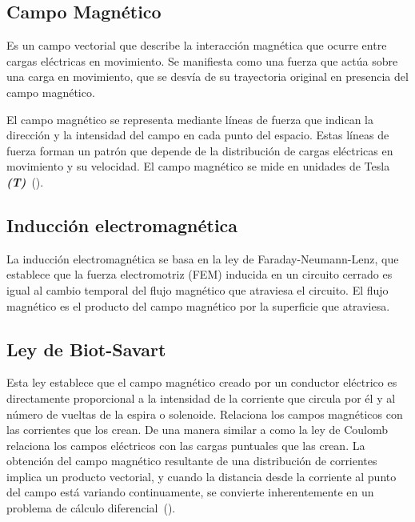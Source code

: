\documentclass[twocolumn, 12pt]{article}
\begin{document}
\subsection*{Campo Magnético}

Es un campo vectorial que describe la interacción magnética
que ocurre entre cargas eléctricas en movimiento. Se
manifiesta como una fuerza que actúa sobre una carga en
movimiento, que se desvía de su trayectoria original en
presencia del campo magnético.

El campo magnético se representa mediante líneas de fuerza
que indican la dirección y la intensidad del campo en cada
punto del espacio. Estas líneas de fuerza forman un patrón
que depende de la distribución de cargas eléctricas en
movimiento y su velocidad. El campo magnético se mide en
unidades de Tesla
\textit{\textbf{(T)}}~(\cite{magnetic-fields-khanacademy}).

\subsection*{Inducción electromagnética}

La inducción electromagnética se basa en la ley de
Faraday-Neumann-Lenz, que establece que la fuerza
electromotriz (FEM) inducida en un circuito cerrado es
igual al cambio temporal del flujo magnético que atraviesa
el circuito. El flujo magnético es el producto del campo
magnético por la superficie que atraviesa.

\subsection*{Ley de Biot-Savart}

Esta ley establece que el campo magnético creado por un
conductor eléctrico es directamente proporcional a la
intensidad de la corriente que circula por él y al número
de vueltas de la espira o solenoide. Relaciona los campos
magnéticos con las corrientes que los crean. De una manera
similar a como la ley de Coulomb relaciona los campos
eléctricos con las cargas puntuales que las crean. La
obtención del campo magnético resultante de una
distribución de corrientes implica un producto vectorial, y
cuando la distancia desde la corriente al punto del campo
está variando continuamente, se convierte inherentemente en
un problema de cálculo
diferencial~(\textcite{biot-savart-law}).
\end{document}
